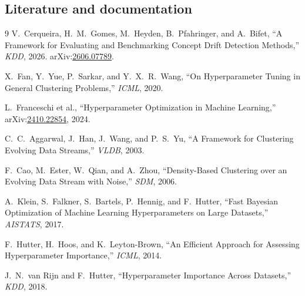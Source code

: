 \subsection*{Literature and documentation}
\begin{thebibliography}{9}
\small
{}
V.~Cerqueira, H.~M.~Gomes, M.~Heyden, B.~Pfahringer, and A.~Bifet,
``A Framework for Evaluating and Benchmarking Concept Drift Detection Methods,''
\emph{KDD}, 2026. arXiv:\href{https://arxiv.org/abs/2606.07789}{2606.07789}.

X.~Fan, Y.~Yue, P.~Sarkar, and Y.~X.~R.~Wang,
``On Hyperparameter Tuning in General Clustering Problems,''
\emph{ICML}, 2020.

L.~Franceschi et al.,
``Hyperparameter Optimization in Machine Learning,''
arXiv:\href{https://arxiv.org/abs/2410.22854}{2410.22854}, 2024.

C.~C.~Aggarwal, J.~Han, J.~Wang, and P.~S.~Yu,
``A Framework for Clustering Evolving Data Streams,''
\emph{VLDB}, 2003.

F.~Cao, M.~Ester, W.~Qian, and A.~Zhou,
``Density-Based Clustering over an Evolving Data Stream with Noise,''
\emph{SDM}, 2006.

A.~Klein, S.~Falkner, S.~Bartels, P.~Hennig, and F.~Hutter,
``Fast Bayesian Optimization of Machine Learning Hyperparameters on Large Datasets,''
\emph{AISTATS}, 2017.

F.~Hutter, H.~Hoos, and K.~Leyton-Brown,
``An Efficient Approach for Assessing Hyperparameter Importance,''
\emph{ICML}, 2014.

J.~N.~van Rijn and F.~Hutter,
``Hyperparameter Importance Across Datasets,''
\emph{KDD}, 2018.
\end{thebibliography}
